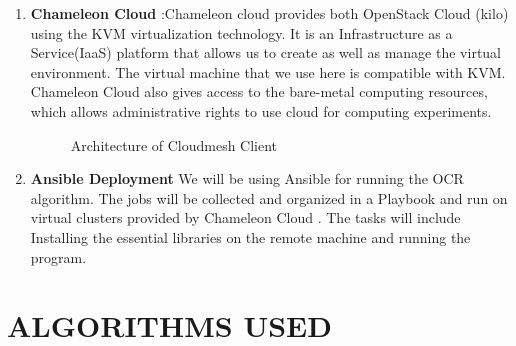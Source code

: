 \documentclass[9pt,twocolumn,twoside]{../../styles/osajnl}
\begin{document}
\begin{enumerate}
\item{\bfseries Chameleon Cloud} :Chameleon cloud provides both
  OpenStack Cloud (kilo) using the KVM virtualization
  technology\cite{www-chameleon-openstack}. It is an Infrastructure as
  a Service(IaaS) platform that allows us to create as well as manage
  the virtual environment.  The virtual machine that we use here is
  compatible with KVM. Chameleon Cloud also gives access to the
  bare-metal computing resources, which allows administrative rights to
  use cloud for computing experiments\cite{www-chameleon-baremetal}.
  
\begin{figure}
\centering
{}
\caption{Architecture of Cloudmesh Client}\cite{cloudmesh}
\label{Architecture of Cloudmesh Client}
\end{figure}

\item{\bfseries Ansible Deployment} We will be using Ansible
  \cite{www-ansible} for running the OCR algorithm. The jobs will be
  collected and organized in a Playbook \cite{www-ansible-playbook}
  and run on virtual clusters provided by Chameleon Cloud
  \cite{www-chameleoncloud}.  The tasks will include Installing the
  essential libraries on the remote machine and running the program.

\end{enumerate}

\section {ALGORITHMS USED}
\end{document}
